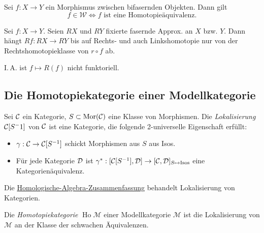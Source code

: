 \documentclass{cheat-sheet}
\newcommand{\Weak}{\mathcal{W}} %
\newcommand{\ModC}{\mathcal{M}} %
\DeclareMathOperator{\Ho}{Ho} %
\begin{document}
\begin{thm}[Whitehead]
  Sei $f : X \to Y$ ein Morphismus zwischen bifasernden Objekten. Dann gilt
  \[ f \in \Weak \iff \text{$f$ ist eine Homotopieäquivalenz.} \]
\end{thm}

\begin{lem}
  Sei $f : X \to Y$. Seien $RX$ und $RY$ fixierte fasernde Approx. an $X$ bzw. $Y$.
  Dann hängt $Rf : RX \to RY$ bis auf Rechts- und auch Linkshomotopie nur von der Rechtshomotopieklasse von $r \circ f$ ab.
\end{lem}

\begin{acht}
  I.\,A. ist $f \mapsto R(f)$ nicht funktoriell.
\end{acht}

\subsection{Die Homotopiekategorie einer Modellkategorie}



\begin{defn}
  Sei $\mathcal{C}$ ein Kategorie, $S \subset \operatorname{Mor}(\mathcal{C})$ eine Klasse von Morphismen. Die \emph{Lokalisierung} $\mathcal{C}[S^-1]$ von $\mathcal{C}$ ist eine Kategorie, die folgende 2-universelle Eigenschaft erfüllt:
  \begin{itemize}
    \item $\gamma : \mathcal{C} \to \mathcal{C}[S^{-1}]$ schickt Morphismen aus $S$ aus Isos.
    \item Für jede Kategorie $\mathcal{D}$ ist $\gamma^* : [\mathcal{C}[S^{-1}], \mathcal{D}] \to [\mathcal{C}, \mathcal{D}]_{S \mapsto \text{Isos}}$ eine Kategorienäquivalenz.
  \end{itemize}
\end{defn}

\begin{bem}
  Die \href{http://timbaumann.info/uni-spicker/homoalg.pdf}{Homologische-Algebra-Zusammenfassung} behandelt Lokalisierung von Kategorien.
\end{bem}

\begin{defn}
  Die \emph{Homotopiekategorie} $\Ho \ModC$ einer Modellkategorie $\ModC$ ist die Lokalisierung von $\ModC$ an der Klasse der schwachen Äquivalenzen.
\end{defn}
\end{document}
